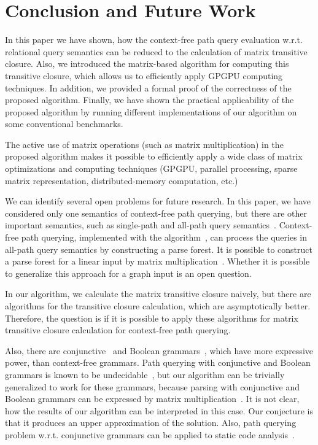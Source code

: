 \section{Conclusion and Future Work}
\label{section_conclusion}

In this paper we have shown, how the context-free path query evaluation w.r.t. relational query semantics can be reduced to the calculation of matrix transitive closure. Also, we introduced the matrix-based algorithm for computing this transitive closure, which allows us to efficiently apply GPGPU computing techniques. In addition, we provided a formal proof of the correctness of the proposed algorithm. Finally, we have shown the practical applicability of the proposed algorithm by running different implementations of our algorithm on some conventional benchmarks.

The active use of matrix operations (such as matrix multiplication) in the proposed algorithm makes it possible to efficiently apply a wide class of matrix optimizations and computing techniques (GPGPU, parallel processing, sparse matrix representation, distributed-memory computation, etc.)

We can identify several open problems for future research. In this paper, we have considered only one semantics of context-free path querying, but there are other important semantics, such as single-path and all-path query semantics~\cite{hellingsPathQuerying}. Context-free path querying, implemented with the algorithm~\cite{GLL}, can process the queries in all-path query semantics by constructing a parse forest. It is possible to construct a parse forest for a linear input by matrix multiplication~\cite{okhotin_cyk}. Whether it is possible to generalize this approach for a graph input is an open question.

In our algorithm, we calculate the matrix transitive closure naively, but there are algorithms for the transitive closure calculation, which are asymptotically better. Therefore, the question is if it is possible to apply these algorithms for matrix transitive closure calculation for context-free path querying.

Also, there are conjunctive~\cite{okhotinConjAndBool} and Boolean grammars~\cite{okhotinBoolean}, which have more expressive power, than context-free grammars. Path querying with conjunctive and Boolean grammars is known to be undecidable~\cite{hellingsRelational}, but our algorithm can be trivially generalized to work for these grammars, because parsing with conjunctive and Boolean grammars can be expressed by matrix multiplication~\cite{okhotin_cyk}. It is not clear, how the results of our algorithm can be interpreted in this case. Our conjecture is that it produces an upper approximation of the solution. Also, path querying problem w.r.t. conjunctive grammars can be applied to static code analysis~\cite{zhang2017context}.
